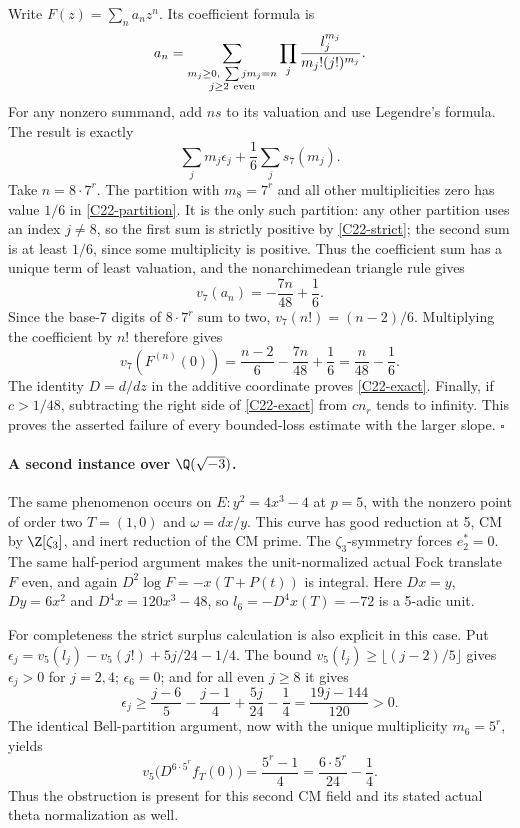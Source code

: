 Write $F(z)=\sum_n a_nz^n$.  Its coefficient formula is
\[
 a_n=
 \sum_{\substack{m_j\geq0,\ \sum jm_j=n\\j\geq2\ {\rm even}}}
       \prod_j\frac{l_j^{m_j}}{m_j!(j!)^{m_j}}.
\]
For any nonzero summand, add $ns$ to its valuation and use
Legendre's formula.  The result is exactly
\begin{equation}\label{C22-partition}
 \sum_j m_j\epsilon_j
       +\frac16\sum_j s_7(m_j).
\end{equation}
Take $n=8\cdot7^r$.
The partition with $m_8=7^r$ and all other multiplicities
zero has value $1/6$ in \eqref{C22-partition}.
It is the only such partition: any other partition uses an
index $j\ne8$, so the first sum is strictly positive by
\eqref{C22-strict}; the second sum is at least $1/6$,
since some multiplicity is positive.
Thus the coefficient sum has a unique term of least valuation,
and the nonarchimedean triangle rule gives
\[
 v_7(a_n)=-\frac{7n}{48}+\frac16.
\]
Since the base-7 digits of $8\cdot7^r$ sum to two,
$v_7(n!)=(n-2)/6$.  Multiplying the coefficient by $n!$
therefore gives
\[
 v_7(F^{(n)}(0))=
    \frac{n-2}{6}-\frac{7n}{48}+\frac16
    =\frac{n}{48}-\frac16.
\]
The identity $D=d/dz$ in the additive coordinate proves
\eqref{C22-exact}.  Finally, if $c>1/48$, subtracting the
right side of \eqref{C22-exact} from $c n_r$ tends to
infinity.  This proves the asserted failure of every bounded-loss
estimate with the larger slope. \hfill$\square$

\paragraph{A second instance over $\Q(\sqrt{-3})$.}
The same phenomenon occurs on
$E:y^2=4x^3-4$ at $p=5$, with the nonzero point of
order two $T=(1,0)$ and $\omega=dx/y$.
This curve has good reduction at 5, CM by
$\Z[\zeta_3]$, and inert reduction of the CM prime.
The $\zeta_3$-symmetry forces $e_2^*=0$.
The same half-period argument makes the unit-normalized
actual Fock translate $F$ even, and again
$D^2\log F=-x(T+P(t))$ is integral.
Here $Dx=y$, $Dy=6x^2$ and
$D^4x=120x^3-48$, so
$l_6=-D^4x(T)=-72$ is a 5-adic unit.

For completeness the strict surplus calculation is also
explicit in this case.  Put
$\epsilon_j=v_5(l_j)-v_5(j!)+5j/24-1/4$.
The bound $v_5(l_j)\geq\lfloor(j-2)/5\rfloor$
gives $\epsilon_j>0$ for $j=2,4$;
$\epsilon_6=0$; and for all even $j\geq8$ it gives
\[
 \epsilon_j\geq
    \frac{j-6}{5}-\frac{j-1}{4}
          +\frac{5j}{24}-\frac14
       =\frac{19j-144}{120}>0.
\]
The identical Bell-partition argument, now with the
unique multiplicity $m_6=5^r$, yields
\[
 v_5\bigl(D^{6\cdot5^r}f_T(0)\bigr)
       =\frac{5^r-1}{4}
       =\frac{6\cdot5^r}{24}-\frac14.
\]
Thus the obstruction is present for this second CM field
and its stated actual theta normalization as well.

